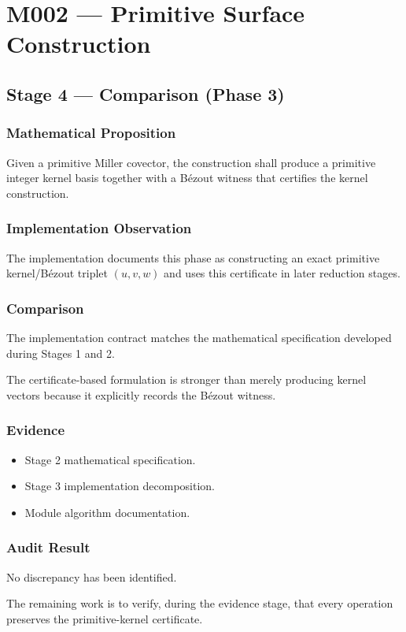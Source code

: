 
\chapter{M002 --- Primitive Surface Construction}

\section{Stage 4 --- Comparison (Phase 3)}

\subsection{Mathematical Proposition}

Given a primitive Miller covector, the construction shall produce a
primitive integer kernel basis together with a Bézout witness that
certifies the kernel construction.

\subsection{Implementation Observation}

The implementation documents this phase as constructing an exact
primitive kernel/Bézout triplet $(u,v,w)$ and uses this certificate in
later reduction stages.

\subsection{Comparison}

The implementation contract matches the mathematical specification
developed during Stages 1 and 2.

The certificate-based formulation is stronger than merely producing
kernel vectors because it explicitly records the Bézout witness.

\subsection{Evidence}

\begin{itemize}
\item Stage 2 mathematical specification.
\item Stage 3 implementation decomposition.
\item Module algorithm documentation.
\end{itemize}

\subsection{Audit Result}

No discrepancy has been identified.

The remaining work is to verify, during the evidence stage, that every
operation preserves the primitive-kernel certificate.
